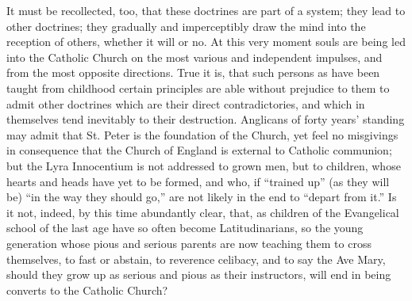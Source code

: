 It must be recollected, too, that these doctrines
are part of a system; they lead to other doctrines; they gradually and
imperceptibly draw the mind into the reception of others, whether it
will or no. At this very moment souls are being led into the Catholic
Church on the most various and independent impulses, and from the most
opposite directions. True it is, that such persons as have been taught
from childhood certain principles are able without prejudice to them
to admit other doctrines which are their direct contradictories, and
which in themselves tend inevitably to their destruction. Anglicans of
forty years' standing may admit that St. Peter is the foundation of
the Church, yet feel no misgivings in consequence that the Church of
England is external to Catholic communion; but the Lyra Innocentium is
not addressed to grown men, but to children, whose hearts and heads
have yet to be formed, and who, if ``trained up'' (as they will be) ``in
the way they should go,'' are not likely in the end to ``depart from it.''
Is it not, indeed, by this time abundantly clear, that, as children of
the Evangelical school of the last age have so often become
Latitudinarians, so the young generation whose pious and serious
parents are now teaching them to cross themselves, to fast or abstain,
to reverence celibacy, and to say the Ave Mary, should they grow up as
serious and pious as their instructors, will end in being converts to
the Catholic Church?


